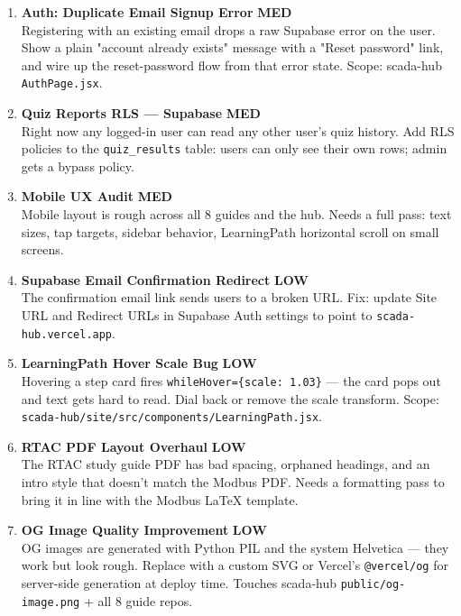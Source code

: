 \documentclass[10pt]{article}
\newcommand{\med}{\textcolor{samber}{\small\bfseries MED}}
\newcommand{\low}{\textcolor{sgreen}{\small\bfseries LOW}}
\begin{document}
\begin{enumerate}[resume]\small
  \item \textbf{Auth: Duplicate Email Signup Error} \hfill \med \\
    Registering with an existing email drops a raw Supabase error on the user. Show a plain "account already exists" message with a "Reset password" link, and wire up the reset-password flow from that error state. Scope: scada-hub \texttt{AuthPage.jsx}.

  \item \textbf{Quiz Reports RLS — Supabase} \hfill \med \\
    Right now any logged-in user can read any other user's quiz history. Add RLS policies to the \texttt{quiz\_results} table: users can only see their own rows; admin gets a bypass policy.

  \item \textbf{Mobile UX Audit} \hfill \med \\
    Mobile layout is rough across all 8 guides and the hub. Needs a full pass: text sizes, tap targets, sidebar behavior, LearningPath horizontal scroll on small screens.

  \item \textbf{Supabase Email Confirmation Redirect} \hfill \low \\
    The confirmation email link sends users to a broken URL. Fix: update Site URL and Redirect URLs in Supabase Auth settings to point to \texttt{scada-hub.vercel.app}.

  \item \textbf{LearningPath Hover Scale Bug} \hfill \low \\
    Hovering a step card fires \texttt{whileHover=\{scale: 1.03\}} — the card pops out and text gets hard to read. Dial back or remove the scale transform. Scope: \texttt{scada-hub/site/src/components/LearningPath.jsx}.

  \item \textbf{RTAC PDF Layout Overhaul} \hfill \low \\
    The RTAC study guide PDF has bad spacing, orphaned headings, and an intro style that doesn't match the Modbus PDF. Needs a formatting pass to bring it in line with the Modbus LaTeX template.

  \item \textbf{OG Image Quality Improvement} \hfill \low \\
    OG images are generated with Python PIL and the system Helvetica — they work but look rough. Replace with a custom SVG or Vercel's \texttt{@vercel/og} for server-side generation at deploy time. Touches scada-hub \texttt{public/og-image.png} + all 8 guide repos.
\end{enumerate}
\end{document}
